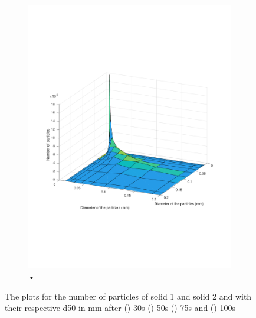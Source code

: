 \documentclass[preprint,11pt,authoryear]{elsarticle}
\begin{document}
\begin{figure}[H]
\begin{subfigure}{.5\textwidth}
\includegraphics[scale=0.45]{rslts:PBM_100s_psd.pdf}
\caption{•}
	\label{fig:100s}
\end{subfigure}
\caption{The plots for the number of particles of solid 1 and solid 2 and with their respective d50 in mm after () 30s () 50s () 75s and () 100s}
\label{fig:rslts_PBM_d50_plots}
\end{figure}   
\end{document}
